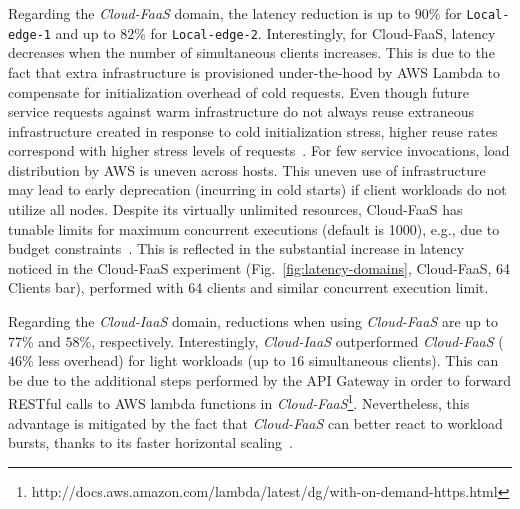 Regarding the \textit{Cloud-FaaS} domain, the latency reduction is up to $90$\% for \texttt{Local-edge-1} and up to $82$\% for \texttt{Local-edge-2}. Interestingly, for Cloud-FaaS, latency decreases when the number of simultaneous clients increases.
This is due to the fact that extra infrastructure is provisioned under-the-hood by AWS Lambda to compensate for initialization overhead of cold requests. Even though future service requests against warm infrastructure do not always reuse extraneous infrastructure created in response to cold initialization stress, higher reuse rates correspond with higher stress levels of requests~\cite{Lloyd18serverless}. For few service invocations, load distribution by AWS is uneven across hosts. This uneven use of infrastructure may lead to early deprecation (incurring in cold starts) if client workloads do not utilize all nodes. 
Despite its virtually unlimited resources, Cloud-FaaS has tunable limits for maximum concurrent executions (default is 1000), e.g., due to budget constraints~\cite{Villamizar2017lambda}. This is reflected in the substantial increase in latency noticed in the Cloud-FaaS experiment (Fig.~\ref{fig:latency-domains}, Cloud-FaaS, 64 Clients bar), performed with 64 clients and similar concurrent execution limit.

Regarding the \textit{Cloud-IaaS} domain, reductions when using \textit{Cloud-FaaS} are up to $77$\% and $58$\%, respectively. Interestingly, \textit{Cloud-IaaS} outperformed  \textit{Cloud-FaaS} ($46$\% less overhead) for light workloads (up to $16$ simultaneous clients). This can be due to the additional steps performed by the API Gateway in order to forward RESTful calls to AWS lambda functions in \textit{Cloud-FaaS}\footnote{http://docs.aws.amazon.com/lambda/latest/dg/with-on-demand-https.html}. Nevertheless, this advantage is mitigated by the fact that \textit{Cloud-FaaS} can better react to workload bursts, thanks to its faster horizontal scaling~\cite{Villamizar2017lambda,Hendrickson:2016}. 
 
